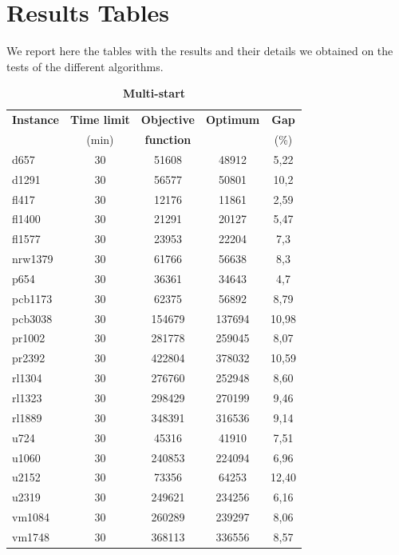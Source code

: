 \newpage

\section{Results Tables}
We report here the tables with the results and their details we obtained on the tests of the different algorithms.

\begin{table}[h!]
	\begin{center}
		\caption{\textbf{\large Multi-start}}
		\begin{tabular}{l|c|c|c|c}
			\textbf{Instance} & \textbf{Time limit} & \textbf{Objective} & \textbf{Optimum} & \textbf{ Gap } \\
			& (min) & \textbf{function} & & (\%)\\
			\hline
			d657 & 30 & 51608 & 48912 & 5,22 \\
			d1291 & 30 & 56577 & 50801 & 10,2  \\
			fl417 & 30 & 12176 & 11861 & 2,59\\
			fl1400 & 30 & 21291 & 20127 &  5,47 \\
			fl1577 & 30 & 23953 & 22204 &  7,3\\
			nrw1379 & 30 & 61766 & 56638 & 8,3 \\
			p654 & 30 & 36361 & 34643 & 4,7 \\
			pcb1173 & 30 & 62375 & 56892 & 8,79  \\
			pcb3038 & 30 & 154679 & 137694 & 10,98  \\
			pr1002 & 30 & 281778 & 259045 & 8,07  \\
			pr2392 & 30 & 422804 & 378032 & 10,59 \\
			rl1304 & 30 & 276760 & 252948 & 8,60  \\
			rl1323 & 30  & 298429 & 270199 &  9,46 \\
			rl1889 & 30 & 348391 & 316536 & 9,14 \\
			u724 & 30 & 45316 & 41910 & 7,51 \\
			u1060 & 30 & 240853 & 224094 & 6,96  \\
			u2152 & 30 & 73356 & 64253 & 12,40 \\
			u2319 & 30 & 249621 & 234256 & 6,16 \\
			vm1084 & 30 & 260289 & 239297 & 8,06  \\
			vm1748 & 30 & 368113 & 336556 & 8,57 \\
		\end{tabular}
	\end{center}
\end{table}

